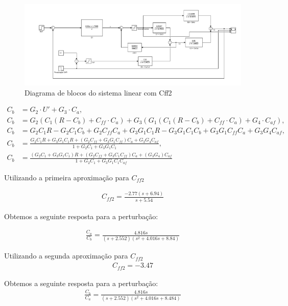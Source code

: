 \documentclass[a4paper,12pt]{article}
\begin{document}
\begin{figure} [H]
    \centering
    \includegraphics[width=0.8\linewidth]{image21.png}
    \caption{Diagrama de blocos do sistema linear com Cff2}
    
\end{figure}

\begin{align}
C_b &= G_2 \cdot U' + G_3 \cdot C_a, \\
C_b &= G_2 (C_1 (R - C_b) + C_{ff} \cdot C_a) + G_3 (G_1 (C_1 (R - C_b) + C_{ff} \cdot C_a) + G_4 \cdot C_{af}), \\
C_b &= G_2 C_1 R - G_2 C_1 C_b + G_2 C_{ff} C_a + G_3 G_1 C_1 R - G_3 G_1 C_1 C_b + G_3 G_1 C_{ff} C_a + G_3 G_4 C_{af}, \\
C_b &= \frac{G_2 C_1 R + G_3 G_1 C_1 R + (G_2 C_{ff} + G_3 G_1 C_{ff}) C_a + G_3 G_4 C_{af}}{1 + G_2 C_1 + G_3 G_1 C_1}, \\
C_b &= \frac{(G_2 C_1 + G_3 G_1 C_1) R + (G_2 C_{ff} + G_3 C_1 C_{ff}) C_a + (G_3 G_4)C_{af}}{1 + G_2 C_1 + G_3 G_1 C_1 C_{af}}
\end{align}


Utilizando a primeira aproximação para \(C_{ff2}\)

\begin{align}
C_{ff2} = \frac{-2.77(s+6.94)}{s+5.54}
\end{align}

Obtemos a seguinte resposta para a perturbação:

\begin{align}
\frac{C_a}{C_b} = \frac{4.816s}{(s+2.552)(s^2+4.016s+8.84)}
\end{align}

Utilizando a segunda aproximação para \(C_{ff2}\)
\begin{align}
C_{ff2} = -3.47
\end{align}

Obtemos a seguinte resposta para a perturbação:
\begin{align}
\frac{C_b}{C_a} = \frac{4.816s}{(s+2.552)(s^2+4.016s+8.484)}
\end{align}
\end{document}
